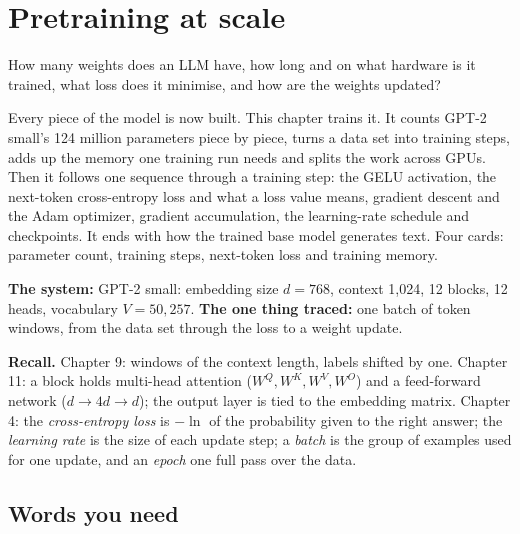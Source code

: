 \chapter{Pretraining at scale}
\label{ch:pre}

\begin{question}
How many weights does an LLM have, how long and on what hardware is it trained, what loss does it minimise, and how are the weights updated?
\end{question}

\begin{whatfor}
Every piece of the model is now built. This chapter trains it. It counts GPT-2 small's 124 million parameters piece by piece, turns a data set into training steps, adds up the memory one training run needs and splits the work across GPUs. Then it follows one sequence through a training step: the GELU activation, the next-token cross-entropy loss and what a loss value means, gradient descent and the Adam optimizer, gradient accumulation, the learning-rate schedule and checkpoints. It ends with how the trained base model generates text. Four cards: parameter count, training steps, next-token loss and training memory.
\end{whatfor}

\begin{setup}
\textbf{The system:} GPT-2 small: embedding size $d = 768$, context 1,024, 12 blocks, 12 heads, vocabulary $V = 50{,}257$.
\textbf{The one thing traced:} one batch of token windows, from the data set through the loss to a weight update.
\end{setup}

\begin{recall}
\textbf{Recall.} Chapter 9: windows of the context length, labels shifted by one. Chapter 11: a block holds multi-head attention ($W^Q, W^K, W^V, W^O$) and a feed-forward network ($d \to 4d \to d$); the output layer is tied to the embedding matrix. Chapter 4: the \emph{cross-entropy loss} is $-\ln$ of the probability given to the right answer; the \emph{learning rate} is the size of each update step; a \emph{batch} is the group of examples used for one update, and an \emph{epoch} one full pass over the data.
\end{recall}

\section{Words you need}

